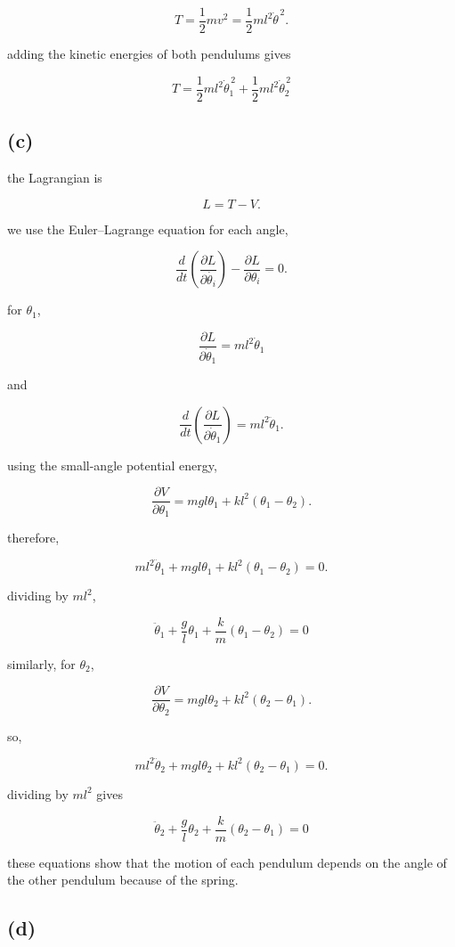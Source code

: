 \documentclass{article}
\begin{document}
\[
T=\frac{1}{2}mv^2
=\frac{1}{2}ml^2\dot{\theta}^{\,2}.
\]

adding the kinetic energies of both pendulums gives

\[
\boxed{
T=\frac{1}{2}ml^2\dot{\theta}_1^{\,2}
+\frac{1}{2}ml^2\dot{\theta}_2^{\,2}
}
\]

\subsection*{(c)}

the Lagrangian is

\[
L=T-V.
\]

we use the Euler--Lagrange equation for each angle,

\[
\frac{d}{dt}\left(\frac{\partial L}{\partial\dot{\theta_i}}\right)
-\frac{\partial L}{\partial\theta_i}=0.
\]

for $\theta_1$,

\[
\frac{\partial L}{\partial\dot{\theta}_1}
=ml^2\dot{\theta}_1
\]

and

\[
\frac{d}{dt}\left(\frac{\partial L}{\partial\dot{\theta}_1}\right)
=ml^2\ddot{\theta}_1.
\]

using the small-angle potential energy,

\[
\frac{\partial V}{\partial\theta_1}
=mgl\theta_1+kl^2(\theta_1-\theta_2).
\]

therefore,

\[
ml^2\ddot{\theta}_1+mgl\theta_1
+kl^2(\theta_1-\theta_2)=0.
\]

dividing by $ml^2$,

\[
\boxed{
\ddot{\theta}_1+\frac{g}{l}\theta_1
+\frac{k}{m}(\theta_1-\theta_2)=0
}
\]

similarly, for $\theta_2$,

\[
\frac{\partial V}{\partial\theta_2}
=mgl\theta_2+kl^2(\theta_2-\theta_1).
\]

so,

\[
ml^2\ddot{\theta}_2+mgl\theta_2
+kl^2(\theta_2-\theta_1)=0.
\]

dividing by $ml^2$ gives

\[
\boxed{
\ddot{\theta}_2+\frac{g}{l}\theta_2
+\frac{k}{m}(\theta_2-\theta_1)=0
}
\]

these equations show that the motion of each pendulum depends on the angle of the other pendulum because of the spring.

\subsection*{(d)}
\end{document}
